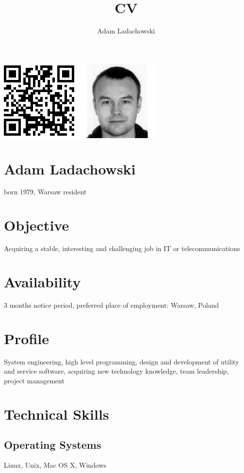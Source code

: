 \documentclass[9pt,a4paper,twocolumn]{extarticle}
\title{CV}
\author{Adam Ladachowski}
\begin{document}
\includegraphics[width=\columnwidth]{photo_qr.png}

\section*{Adam Ladachowski}
born 1979, Warsaw resident

\section*{Objective}

Acquiring a stable, interesting and challenging job in IT or telecommunications

\section*{Availability}

3 months notice period, preferred place of employment: Warsaw, Poland

\section*{Profile}

System engineering, high level programming, design and development of utility and service software, acquiring new technology knowledge, team leadership, project management

\section*{Technical Skills}

\subsection*{Operating Systems}
Linux, Unix, Mac OS X, Windows
\end{document}
